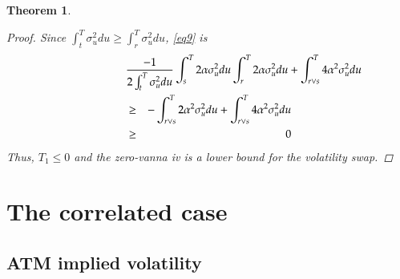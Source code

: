 \documentclass[11pt]{article}
\newtheorem{theorem}{Theorem}
\begin{document}
\begin{theorem}
\begin{proof}
Since $\int_t^T \sigma_u^2 du \ge \int_r^T \sigma_u^2 du$, \eqref{eq9} is
\begin{eqnarray}
\lefteqn{\frac{-1}{2 \int_t^T \sigma_u^2 du}\int_s^T 2\alpha \sigma_u^2 du\int_r^T 2\alpha \sigma_u^2 du+\int_{r\vee s}^T 4\alpha^2 \sigma_u^2 du} \nonumber\\
&\ge& - \int_{r\vee s}^T 2\alpha^2 \sigma_u^2 du+\int_{r\vee s}^T 4\alpha^2 \sigma_u^2 du \nonumber\\
&\ge& 0
\end{eqnarray}
Thus, $T_1 \le 0$ and the zero-vanna iv is a lower bound for the volatility swap.
\end{proof}
\end{theorem}


\section{The correlated case}

\subsection{ATM implied volatility}
\end{document}
